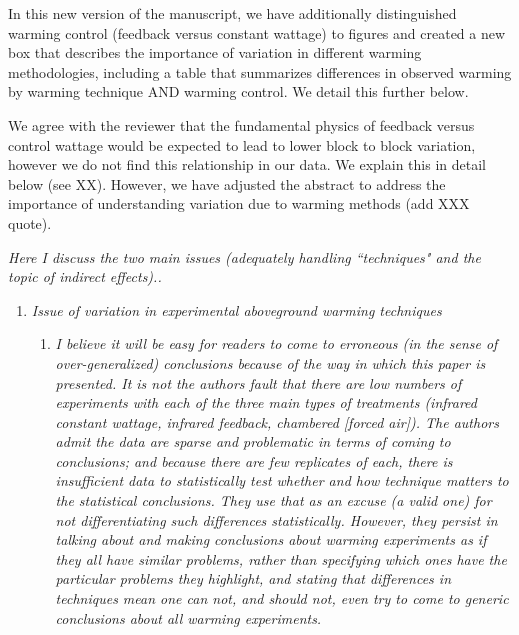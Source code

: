 \documentclass[11pt,a4paper]{letter}
\begin{document}
\begin{letter}{}
\par In this new version of the manuscript, we have additionally distinguished warming control (feedback versus constant wattage) to figures and created a new box that describes the importance of variation in different warming methodologies, including a table that summarizes differences in observed warming by warming technique AND warming control. We detail this further below. %
\par We agree with the reviewer that the fundamental physics of feedback versus control wattage would be expected to lead to lower block to block variation, however we do not find this relationship in our data. We explain this in detail below (see XX). However, we have adjusted the abstract to address the importance of understanding variation due to warming methods (add XXX quote).\\
 
\par \emph {Here I discuss the two main issues (adequately handling ``techniques" and the
topic of indirect effects)..}
\begin{enumerate} 
\item \emph{Issue of variation in experimental aboveground warming techniques}
\begin{enumerate}
\item \emph{I believe it will be easy for readers to come to erroneous (in the sense of over-generalized) conclusions because of the way in which this paper is presented. It is not the authors fault that there are low numbers of
experiments with each of the three main types of treatments (infrared constant wattage, infrared feedback, chambered [forced air]). The authors admit the data are sparse and problematic in terms of coming to conclusions; and because there are few replicates of each, there is insufficient data to statistically test whether and how technique matters to the statistical conclusions. They use that as an excuse (a valid one) for not differentiating such differences statistically. However, they persist in talking about and making conclusions about warming experiments as if they all have similar problems, rather than specifying which ones have the particular problems they highlight, and stating that differences in techniques mean one can not, and should not, even try to come to generic conclusions about all warming experiments.}


\end{enumerate}
\end{enumerate}
\end{letter}
\end{document}
